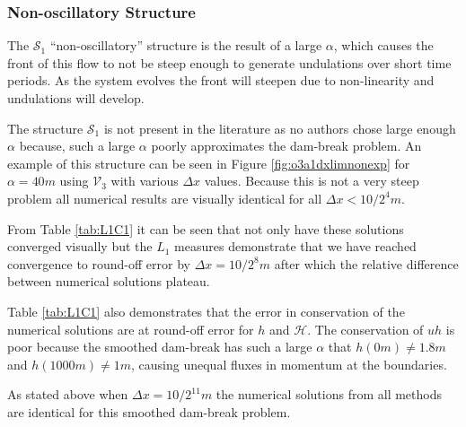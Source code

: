 \documentclass[times]{elsarticle}
\begin{document}
\subsubsection{Non-oscillatory Structure}
The $\mathcal{S}_1$ ``non-oscillatory'' structure is the result of a large $\alpha$, which causes the front of this flow to not be steep enough to generate undulations over short time periods. As the system evolves the front will steepen due to non-linearity and undulations will develop.

The structure $\mathcal{S}_1$ is not present in the literature as no authors chose large enough $\alpha$ because, such a large $\alpha$ poorly approximates the dam-break problem. An example of this structure can be seen in Figure \ref{fig:o3a1dxlimnonexp} for $\alpha = 40m$ using $\mathcal{V}_3$ with various $\Delta x$ values. Because this is not a very steep problem all numerical results are visually identical for all $\Delta x < 10 / 2^4m$.

From Table \ref{tab:L1C1} it can be seen that not only have these solutions converged visually but the $L_1$ measures demonstrate that we have reached convergence to round-off error by $\Delta x = 10 / 2^8m$ after which the relative difference between numerical solutions plateau. 

Table \ref{tab:L1C1} also demonstrates that the error in conservation of the numerical solutions are at round-off error for $h$ and $\mathcal{H}$. The conservation of $uh$ is poor because the smoothed dam-break has such a large $\alpha$ that $h(0m) \neq 1.8m$ and $h(1000m) \neq 1m$, causing unequal fluxes in momentum at the boundaries. 

As stated above when $\Delta x = 10/2^{11}m$ the numerical solutions from all methods are identical for this smoothed dam-break problem. 
\end{document}
